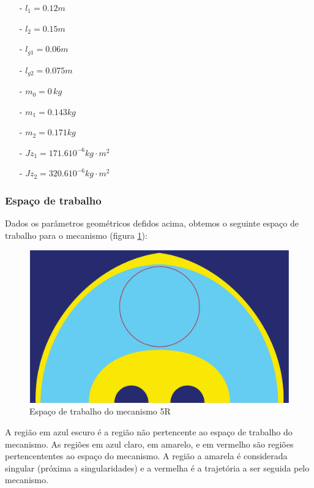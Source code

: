 \documentclass[]{politex}
\begin{document}
\begin{multicols}{2}
\begin{itemize}
\item[-] $l_1 = 0.12 m$
\item[-] $l_2 = 0.15 m$
\item[-] $l_{g1} = 0.06 m$
\item[-] $l_{g2} = 0.075  m$
\item[-] $m_0 = 0 \, kg$
\item[-] $m_1 = 0.143  kg$
\item[-] $m_2 = 0.171  kg$
\item[-] $Jz_1 = 171.6 10^{-6} kg\cdot m^2$
\item[-] $Jz_2 = 320.6 10^{-6} kg\cdot m^2$ \\
\end{itemize}
\end{multicols}

\subsubsection{Espaço de trabalho}

Dados os parâmetros geométricos defidos acima, obtemos o seguinte espaço de trabalho para o mecanismo (figura \ref{fig:RRWS}):

\begin{figure}[h]
	\centering
	\includegraphics[scale=0.25]{../figures/Workspace.pdf}  
	\caption{Espaço de trabalho do mecanismo 5R}
	\label{fig:RRWS}
\end{figure}

A região em azul escuro é a região não pertencente ao espaço de trabalho do mecanismo. As regiões em azul claro, em amarelo, e em vermelho são regiões pertencententes ao espaço do mecanismo. A região a amarela é considerada singular (próxima a singularidades) e a vermelha é a trajetória a ser seguida pelo mecanismo.
\end{document}
